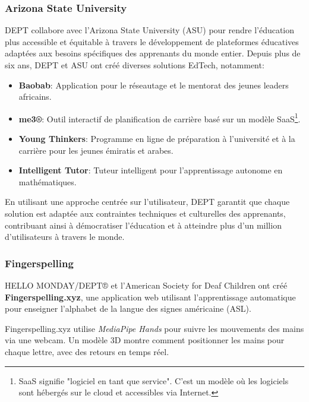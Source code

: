 \subsubsection{Arizona State University}

DEPT collabore avec l'Arizona State University (ASU) pour rendre l'éducation plus accessible et équitable à travers le développement de plateformes éducatives adaptées aux besoins spécifiques des apprenants du monde entier. Depuis plus de six ans, DEPT et ASU ont créé diverses solutions EdTech, notamment:

\begin{itemize}
    \item \textbf{Baobab}: Application pour le réseautage et le mentorat des jeunes leaders africains.
    \item \textbf{me3®}: Outil interactif de planification de carrière basé sur un modèle SaaS\footnote{SaaS signifie "logiciel en tant que service". C'est un modèle où les logiciels sont hébergés sur le cloud et accessibles via Internet.}.
    \item \textbf{Young Thinkers}: Programme en ligne de préparation à l’université et à la carrière pour les jeunes émiratis et arabes.
    \item \textbf{Intelligent Tutor}: Tuteur intelligent pour l'apprentissage autonome en mathématiques.
\end{itemize}

En utilisant une approche centrée sur l'utilisateur, DEPT garantit que chaque solution est adaptée aux contraintes techniques et culturelles des apprenants, contribuant ainsi à démocratiser l'éducation et à atteindre plus d'un million d'utilisateurs à travers le monde.

\subsubsection{Fingerspelling}

HELLO MONDAY/DEPT® et l'American Society for Deaf Children ont créé \textbf{Fingerspelling.xyz}, une application web utilisant l'apprentissage automatique pour enseigner l'alphabet de la langue des signes américaine (ASL).

Fingerspelling.xyz utilise \textit{MediaPipe Hands} pour suivre les mouvements des mains via une webcam. Un modèle 3D montre comment positionner les mains pour chaque lettre, avec des retours en temps réel.

